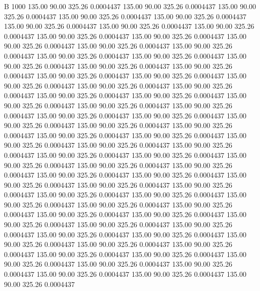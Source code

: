 


B 1000
 135.00   90.00  325.26   0.0004437
 135.00   90.00  325.26   0.0004437
 135.00   90.00  325.26   0.0004437
 135.00   90.00  325.26   0.0004437
 135.00   90.00  325.26   0.0004437
 135.00   90.00  325.26   0.0004437
 135.00   90.00  325.26   0.0004437
 135.00   90.00  325.26   0.0004437
 135.00   90.00  325.26   0.0004437
 135.00   90.00  325.26   0.0004437
 135.00   90.00  325.26   0.0004437
 135.00   90.00  325.26   0.0004437
 135.00   90.00  325.26   0.0004437
 135.00   90.00  325.26   0.0004437
 135.00   90.00  325.26   0.0004437
 135.00   90.00  325.26   0.0004437
 135.00   90.00  325.26   0.0004437
 135.00   90.00  325.26   0.0004437
 135.00   90.00  325.26   0.0004437
 135.00   90.00  325.26   0.0004437
 135.00   90.00  325.26   0.0004437
 135.00   90.00  325.26   0.0004437
 135.00   90.00  325.26   0.0004437
 135.00   90.00  325.26   0.0004437
 135.00   90.00  325.26   0.0004437
 135.00   90.00  325.26   0.0004437
 135.00   90.00  325.26   0.0004437
 135.00   90.00  325.26   0.0004437
 135.00   90.00  325.26   0.0004437
 135.00   90.00  325.26   0.0004437
 135.00   90.00  325.26   0.0004437
 135.00   90.00  325.26   0.0004437
 135.00   90.00  325.26   0.0004437
 135.00   90.00  325.26   0.0004437
 135.00   90.00  325.26   0.0004437
 135.00   90.00  325.26   0.0004437
 135.00   90.00  325.26   0.0004437
 135.00   90.00  325.26   0.0004437
 135.00   90.00  325.26   0.0004437
 135.00   90.00  325.26   0.0004437
 135.00   90.00  325.26   0.0004437
 135.00   90.00  325.26   0.0004437
 135.00   90.00  325.26   0.0004437
 135.00   90.00  325.26   0.0004437
 135.00   90.00  325.26   0.0004437
 135.00   90.00  325.26   0.0004437
 135.00   90.00  325.26   0.0004437
 135.00   90.00  325.26   0.0004437
 135.00   90.00  325.26   0.0004437
 135.00   90.00  325.26   0.0004437
 135.00   90.00  325.26   0.0004437
 135.00   90.00  325.26   0.0004437
 135.00   90.00  325.26   0.0004437
 135.00   90.00  325.26   0.0004437
 135.00   90.00  325.26   0.0004437
 135.00   90.00  325.26   0.0004437
 135.00   90.00  325.26   0.0004437
 135.00   90.00  325.26   0.0004437
 135.00   90.00  325.26   0.0004437
 135.00   90.00  325.26   0.0004437
 135.00   90.00  325.26   0.0004437
 135.00   90.00  325.26   0.0004437
 135.00   90.00  325.26   0.0004437
 135.00   90.00  325.26   0.0004437
 135.00   90.00  325.26   0.0004437
 135.00   90.00  325.26   0.0004437
 135.00   90.00  325.26   0.0004437
 135.00   90.00  325.26   0.0004437
 135.00   90.00  325.26   0.0004437
 135.00   90.00  325.26   0.0004437
 135.00   90.00  325.26   0.0004437
